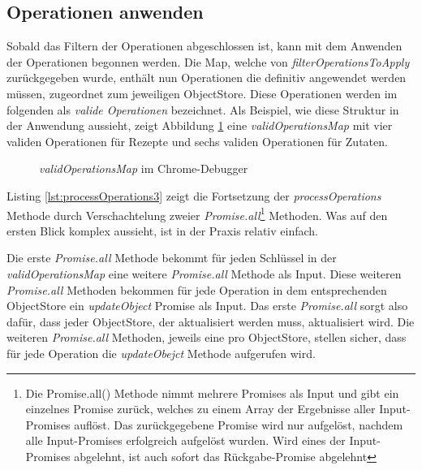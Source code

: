 \documentclass[a4paper, 12pt]{scrreprt}
\begin{document}
\subsection{Operationen anwenden}

Sobald das Filtern der Operationen abgeschlossen ist, kann mit dem Anwenden der Operationen begonnen werden. Die Map, welche von \textit{filterOperationsToApply} zurückgegeben wurde, enthält nun Operationen die definitiv angewendet werden müssen, zugeordnet zum jeweiligen ObjectStore. Diese Operationen werden im folgenden als \textit{valide Operationen} bezeichnet. Als Beispiel, wie diese Struktur in der Anwendung aussieht, zeigt Abbildung \ref{fig:validOperationsMapChrome} eine \textit{validOperationsMap} mit vier validen Operationen für Rezepte und sechs validen Operationen für Zutaten.

\begin{figure}[H]
	\centering
	\caption{\textit{validOperationsMap} im Chrome-Debugger}
	\label{fig:validOperationsMapChrome}
\end{figure}

Listing \ref{lst:processOperations3} zeigt die Fortsetzung der \textit{processOperations} Methode durch Verschachtelung zweier \textit{Promise.all}\footnote{Die Promise.all() Methode nimmt mehrere Promises als Input und gibt ein einzelnes Promise zurück, welches zu einem Array der Ergebnisse aller Input-Promises auflöst. Das zurückgegebene Promise wird nur aufgelöst, nachdem alle Input-Promises erfolgreich aufgelöst wurden. Wird eines der Input-Promises abgelehnt, ist auch sofort das Rückgabe-Promise abgelehnt} Methoden. Was auf den ersten Blick komplex aussieht, ist in der Praxis relativ einfach.

\begin{minipage}{\linewidth}
	
\end{minipage}

Die erste \textit{Promise.all} Methode bekommt für jeden Schlüssel in der \textit{validOperationsMap} eine weitere \textit{Promise.all} Methode als Input. Diese weiteren \textit{Promise.all} Methoden bekommen für jede Operation in dem entsprechenden ObjectStore ein \textit{updateObject} Promise als Input. Das erste \textit{Promise.all} sorgt also dafür, dass jeder ObjectStore, der aktualisiert werden muss, aktualisiert wird. Die weiteren \textit{Promise.all} Methoden, jeweils eine pro ObjectStore, stellen sicher, dass für jede Operation die \textit{updateObejct} Methode aufgerufen wird.
\end{document}
